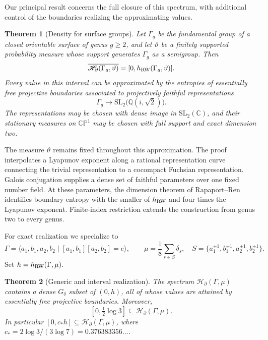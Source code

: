 \documentclass[11pt,letterpaper]{amsart}
\newtheorem{maintheorem}{Theorem}
\theoremstyle{definition}
\theoremstyle{remark}
\numberwithin{equation}{section}
\newcommand{\CP}{\mathbb{CP}}
\newcommand{\HH}{\mathscr H_{\partial}}
\begin{document}
Our principal result concerns the full closure of this spectrum, with
additional control of the boundaries realizing the approximating values.

\begin{maintheorem}[Density for surface groups]\label{thm:all-surface-density}
Let $\Gamma_g$ be the fundamental group of a closed orientable surface of
genus $g\ge2$, and let $\vartheta$ be a finitely supported probability
measure whose support generates $\Gamma_g$ as a semigroup. Then
\[
 \overline{\HH(\Gamma_g,\vartheta)}
 =[0,h_{\rm RW}(\Gamma_g,\vartheta)].
\]
Every value in this interval can be approximated by the entropies of
essentially free projective boundaries associated to projectively
faithful representations
\[
 \Gamma_g\longrightarrow\mathrm{SL}_2\bigl(\mathbb Q(i,\sqrt2)\bigr).
\]
The representations may be chosen with dense image in
$\mathrm{SL}_2(\mathbb C)$, and their stationary measures on
$\CP^1$ may be chosen with full support and exact dimension two.
\end{maintheorem}

The measure $\vartheta$ remains fixed throughout this approximation.
The proof interpolates a Lyapunov exponent along a rational
representation curve connecting the trivial representation to a
cocompact Fuchsian representation. Galois conjugation supplies a dense
set of faithful parameters over one fixed number field. At these
parameters, the dimension theorem of Rapaport--Ren \cite{RR} identifies
boundary entropy with the smaller of $h_{\rm RW}$ and four times the
Lyapunov exponent. Finite-index restriction extends the construction
from genus two to every genus.

For exact realization we specialize to
\begin{equation}\label{eq:fixed-walk}
 \Gamma=\langle a_1,b_1,a_2,b_2\mid[a_1,b_1][a_2,b_2]=e\rangle,
 \qquad
 \mu=\frac18\sum_{s\in S}\delta_s,
 \quad S=\{a_1^{\pm1},b_1^{\pm1},a_2^{\pm1},b_2^{\pm1}\}.
\end{equation}
Set $h=h_{\rm RW}(\Gamma,\mu)$.

\begin{maintheorem}[Generic and interval realization]\label{thm:overview-realization}
The spectrum $\HH(\Gamma,\mu)$ contains a dense $G_\delta$ subset of
$(0,h)$, all of whose values are attained by essentially free projective
boundaries. Moreover,
\begin{equation}\label{eq:main-interval}
 [0,\tfrac12\log3]\subseteq\HH(\Gamma,\mu).
\end{equation}
In particular $[0,c_*h]\subseteq\HH(\Gamma,\mu)$, where
$c_*=2\log3/(3\log7)=0.376383356\ldots$.
\end{maintheorem}
\end{document}
